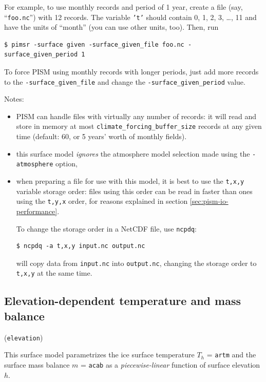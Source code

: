 \documentclass[titlepage,letterpaper,final]{scrartcl}
\begin{document}
For example, to use monthly records and period of 1 year, create a file (say, ``\texttt{foo.nc}'') with 12 records. The variable \texttt{'t'} should contain 0, 1, 2, 3, \dots, 11 and have the units of ``month'' (you can use other units, too). Then, run
\begin{verbatim}
$ pimsr -surface given -surface_given_file foo.nc -surface_given_period 1
\end{verbatim}%

To force PISM using monthly records with longer periods, just add more records to the \texttt{-surface_given_file}  and change the \texttt{-surface_given_period} value.

\noindent Notes:
\begin{itemize}
\item PISM can handle files with virtually any number of records: it will
  read and store in memory at most \texttt{climate_forcing_buffer_size} records
  at any given time (default: 60, or 5 years' worth of monthly fields).
\item this surface model \emph{ignores} the atmosphere model selection made
  using the \texttt{-atmosphere} option,
\item when preparing a file for use with this model, it is best to use the \texttt{t,x,y} variable storage order: files using this order can be read in faster than ones using the \texttt{t,y,x} order, for reasons explained in section \ref{sec:pism-io-performance}.

  To change the storage order in a NetCDF file, use \texttt{ncpdq}:
\begin{verbatim}
$ ncpdq -a t,x,y input.nc output.nc
\end{verbatim}%
  will copy data from \texttt{input.nc} into \texttt{output.nc}, changing the storage order to \texttt{t,x,y} at the same time.
\end{itemize}

\subsection{Elevation-dependent temperature and mass balance}
\label{sec:elev-depend-temp}

(\texttt{elevation})

This surface model parametrizes the ice surface temperature $T_{h}$ = \texttt{artm} and the surface mass balance $m$ = \texttt{acab} as a \emph{piecewise-linear} function of surface elevation $h$.
\end{document}
